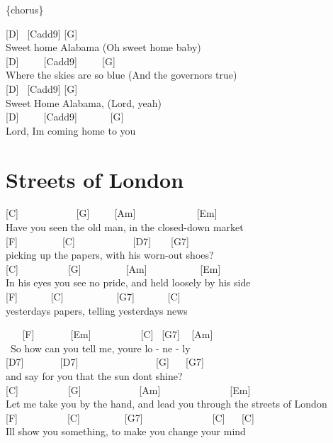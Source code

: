 \documentclass[
  letterpaper,
]{scrbook}
\begin{document}
\{chorus\}

{[}D{]} ~{[}Cadd9{]} {[}G{]} ~ ~\\
Sweet home Alabama (Oh sweet home baby)\\
{[}D{]} ~ ~ ~{[}Cadd9{]} ~ ~ ~{[}G{]} ~\\
Where the skies are so blue (And the governor\textquotesingle s true)\\
{[}D{]} ~{[}Cadd9{]} {[}G{]}\\
Sweet Home Alabama, (Lord, yeah)\\
{[}D{]} ~ ~ ~{[}Cadd9{]} ~ ~ ~ ~{[}G{]}\\
Lord, I\textquotesingle m coming home to you

\hypertarget{streets-of-london}{%
\chapter{Streets of London}\label{streets-of-london}}

{[}C{]} ~ ~ ~ ~ ~ ~ ~{[}G{]} ~ ~ ~{[}Am{]} ~ ~ ~ ~ ~ ~ ~ {[}Em{]}\\
Have you seen the old man, in the closed-down market\\
{[}F{]} ~ ~ ~ ~ ~ {[}C{]} ~ ~ ~ ~ ~ ~ ~{[}D7{]} ~ ~ {[}G7{]}\\
picking up the papers, with his worn-out shoes?\\
{[}C{]} ~ ~ ~ ~ ~ ~{[}G{]} ~ ~ ~ ~ ~ {[}Am{]} ~ ~ ~ ~ ~ ~ {[}Em{]}\\
In his eyes you see no pride, and held loosely by his side\\
{[}F{]} ~ ~ ~ ~{[}C{]} ~ ~ ~ ~ ~ ~ {[}G7{]} ~ ~ ~ ~{[}C{]}\\
yesterday\textquotesingle s papers, telling yesterday\textquotesingle s
news

~ ~ {[}F{]} ~ ~ ~ ~ {[}Em{]} ~ ~ ~ ~ ~ ~{[}C{]} ~{[}G7{]} ~ {[}Am{]}\\
\hspace*{0.333em} ~So how can you tell me, you\textquotesingle re lo -
ne - ly\\
{[}D7{]} ~ ~ ~ ~ {[}D7{]} ~ ~ ~ ~ ~ ~ ~ ~ ~ {[}G{]} ~ ~{[}G7{]}\\
\hspace*{0.333em}and say for you that the sun don\textquotesingle t
shine?\\
{[}C{]} ~ ~ ~ ~ ~ ~{[}G{]} ~ ~ ~ ~ ~ ~ ~{[}Am{]} ~ ~ ~ ~ ~ ~ ~ ~
{[}Em{]}\\
Let me take you by the hand, and lead you through the streets of
London\\
{[}F{]} ~ ~ ~ ~ ~ ~{[}C{]} ~ ~ ~ ~ ~ {[}G7{]} ~ ~ ~ ~ ~ ~ ~ ~ {[}C{]} ~
~{[}C{]}\\
\hspace*{0.333em}I\textquotesingle ll show you something, to make you
change your mind
\end{document}
